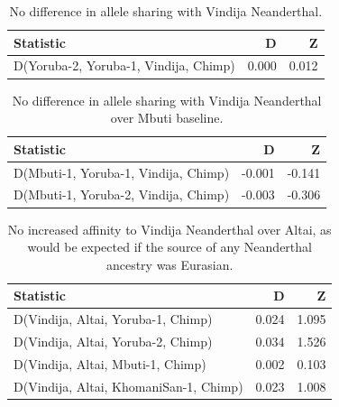 \documentclass{article}
\begin{document}
\begin{table}[ht]
\centering
\begin{tabular}{lrr}
  \hline
Statistic & D & Z \\ 
  \hline
D(Yoruba-2, Yoruba-1, Vindija, Chimp) & 0.000 & 0.012 \\ 
   \hline
\end{tabular}
\caption{No difference in allele sharing with Vindija Neanderthal.} 
\label{dstats:a4}
\end{table}
\begin{table}[ht]
\centering
\begin{tabular}{lrr}
  \hline
Statistic & D & Z \\ 
  \hline
D(Mbuti-1, Yoruba-1, Vindija, Chimp) & -0.001 & -0.141 \\ 
  D(Mbuti-1, Yoruba-2, Vindija, Chimp) & -0.003 & -0.306 \\ 
   \hline
\end{tabular}
\caption{No difference in allele sharing with Vindija Neanderthal over Mbuti baseline.} 
\label{dstats:a5}
\end{table}
\begin{table}[ht]
\centering
\begin{tabular}{lrr}
  \hline
Statistic & D & Z \\ 
  \hline
D(Vindija, Altai, Yoruba-1, Chimp) & 0.024 & 1.095 \\ 
  D(Vindija, Altai, Yoruba-2, Chimp) & 0.034 & 1.526 \\ 
  D(Vindija, Altai, Mbuti-1, Chimp) & 0.002 & 0.103 \\ 
  D(Vindija, Altai, KhomaniSan-1, Chimp) & 0.023 & 1.008 \\ 
   \hline
\end{tabular}
\caption{No increased affinity to Vindija Neanderthal over Altai, as would be expected if the source of any Neanderthal ancestry was Eurasian.} 
\label{dstats:a6}
\end{table}

\end{document}
